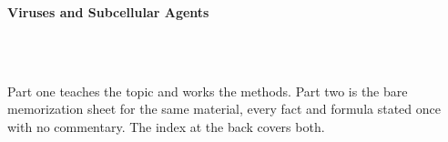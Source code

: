 



\makeindex[title={Index of This Volume},columns=2,intoc]

\begin{titlepage}\thispagestyle{empty}
\vspace*{0.14\textheight}
\noindent{\color{tiercore}\rule{\textwidth}{5pt}}\\[3pt]
\noindent{\color{bioline}\rule{\textwidth}{1pt}}\\[26pt]
\\[12pt]
\noindent\begin{minipage}{\textwidth}\raggedright
{\sffamily\bfseries\fontsize{28}{32}\selectfont\color{bioink}%
 \hyphenchar{} Viruses and Subcellular Agents\par}\end{minipage}\\[16pt]
\noindent{\color{biogreen}\rule{\textwidth}{1.4pt}}\\[10pt]
\noindent\begin{minipage}{\textwidth}\raggedright
{\fontsize{10.5}{14}\selectfont\color{biogreen}%
Part one teaches the topic and works the methods. Part two is the bare memorization sheet for the
same material, every fact and formula stated once with no commentary. The index at the back covers both.\par}\end{minipage}
\vfill
\noindent{\color{bioline}\rule{\textwidth}{1pt}}\\[3pt]
\noindent{\color{tiercore}\rule{\textwidth}{5pt}}
\end{titlepage}
\tableofcontents
\clearpage
{}
\clearpage
\printindex

